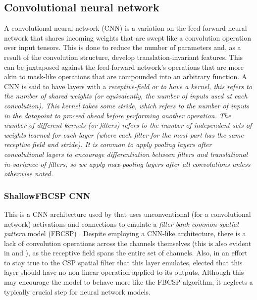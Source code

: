 \documentclass[utf8]{frontiersSCNS} %
\begin{document}
\subsection{Convolutional neural network}


A convolutional neural network (CNN) \cite{LecunnMNIST, GoodfellowTextbook} is a variation on the feed-forward neural network that shares incoming weights that are swept like a convolution operation over input tensors. This is done to reduce the number of parameters and, as a result of the convolution structure, develop translation-invariant features. This can be juxtaposed against the feed-forward network's operations that are more akin to mask-like operations that are compounded into an arbitrary function. A CNN is said to have layers with a \em{receptive-field} or to have a \em{kernel}, this refers to the number of shared weights (or equivalently, the number of inputs used at each convolution). This kernel takes some {\em stride}, which refers to the number of inputs in the datapoint to proceed ahead before performing another operation. The number of different kernels (or filters) refers to the number of independent sets of weights learned for each layer (where each filter for the most part has the same receptive field and stride). It is common to apply pooling layers \cite{} after convolutional layers to encourage differentiation between filters and translational in-variance of filters, so we apply max-pooling \cite{} layers after all convolutions unless otherwise noted.

\subsubsection{ShallowFBCSP CNN}

This is a CNN architecture used by \cite{Schirrmeister2017} that uses unconventional (for a convolutional network) activations and connections to emulate a \emph{filter-bank common spatial pattern} model (FBCSP) \cite{KaiKengAng2008}. Despite employing a CNN-like architecture, there is a lack of convolution operations across the channels themselves (this is also evident in \cite{Lawhern2017} and \cite{Sun}), as the receptive field spans the entire set of channels. Also, in an effort to stay true to the CSP spatial filter that this layer emulates, \cite{Schirrmeister2017} elected that this layer should have no non-linear operation applied to its outputs. Although this may encourage the model to behave more like the FBCSP algorithm, it neglects a typically crucial step for neural network models.
\end{document}
